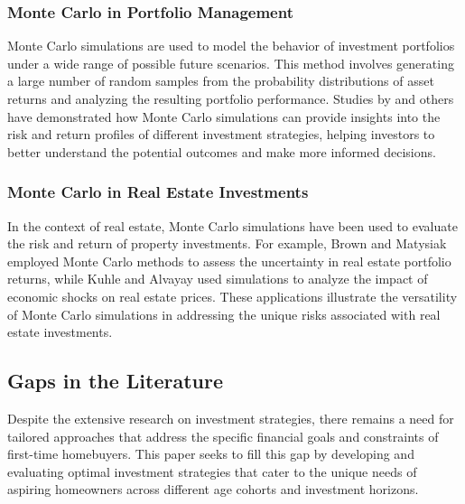 \subsubsection{Monte Carlo in Portfolio Management}
Monte Carlo simulations are used to model the behavior of investment portfolios under a wide range of possible future scenarios. This method involves generating a large number of random samples from the probability distributions of asset returns and analyzing the resulting portfolio performance. Studies by \citet{glasserman2004monte} and others have demonstrated how Monte Carlo simulations can provide insights into the risk and return profiles of different investment strategies, helping investors to better understand the potential outcomes and make more informed decisions.

\subsubsection{Monte Carlo in Real Estate Investments}
In the context of real estate, Monte Carlo simulations have been used to evaluate the risk and return of property investments. For example, Brown and Matysiak \citep{brown2000real} employed Monte Carlo methods to assess the uncertainty in real estate portfolio returns, while Kuhle and Alvayay \citep{kuhle2021economic} used simulations to analyze the impact of economic shocks on real estate prices. These applications illustrate the versatility of Monte Carlo simulations in addressing the unique risks associated with real estate investments.

\subsection{Gaps in the Literature}
Despite the extensive research on investment strategies, there remains a need for tailored approaches that address the specific financial goals and constraints of first-time homebuyers. This paper seeks to fill this gap by developing and evaluating optimal investment strategies that cater to the unique needs of aspiring homeowners across different age cohorts and investment horizons.
